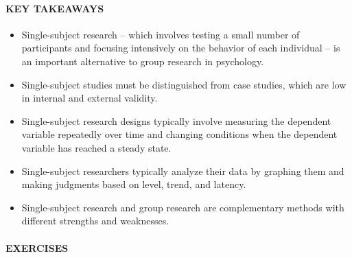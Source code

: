 \documentclass[
]{krantz}
\providecommand{\tightlist}{%
  \setlength{\itemsep}{0pt}\setlength{\parskip}{0pt}}
\begin{document}
\paragraph*{KEY TAKEAWAYS}\label{key-takeaways-17}

\begin{itemize}
\tightlist
\item
  Single-subject research -- which involves testing a small number of participants and focusing intensively on the behavior of each individual -- is an important alternative to group research in psychology.
\item
  Single-subject studies must be distinguished from case studies, which are low in internal and external validity.
\item
  Single-subject research designs typically involve measuring the dependent variable repeatedly over time and changing conditions when the dependent variable has reached a steady state.
\item
  Single-subject researchers typically analyze their data by graphing them and making judgments based on level, trend, and latency.
\item
  Single-subject research and group research are complementary methods with different strengths and weaknesses.
\end{itemize}

\paragraph*{EXERCISES}\label{exercises-15}
\end{document}
